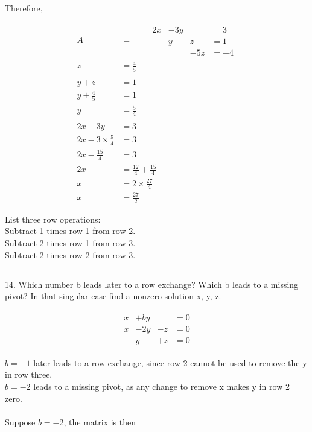 \documentclass[paper=a4, fontsize=10pt]{scrartcl} %
\begin{document}
	Therefore,

	\begin{align*}
		A &= \qquad
		\begin{matrix}
			2x & -3y &     &= 3 \\
			   &   y &   z &= 1 \\
			   &     & -5z &= -4
		\end{matrix}
		\\
		z &= \frac{4}{5} \\
		\\
		y + z &= 1 \\
		y + \frac{4}{5} &= 1 \\
		y &= \frac{5}{4} \\
		\\
		2x -3y &= 3 \\
		2x -3 \times \frac{5}{4} &= 3 \\
		2x -\frac{15}{4} &= 3 \\
		2x &= \frac{12}{4} + \frac{15}{4} \\
		x &= 2 \times \frac{27}{4} \\
		x &= \frac{27}{2}
	\end{align*}

List three row operations: \\
Subtract 1 times row 1 from row 2. \\
Subtract 2 times row 1 from row 3. \\
Subtract 2 times row 2 from row 3. \\

\subsection*{}
\setcounter{equation}{0}

14. Which number b leads later to a row exchange? Which b leads to a missing pivot? In that singular case find a nonzero solution x, y, z.


	\begin{align*}
		\begin{matrix}
			x &+ by &    &= 0 \\
			x &- 2y &- z &= 0 \\
			  &   y &+ z &= 0
		\end{matrix}
	\end{align*}


$b = -1$ later leads to a row exchange, since row 2 cannot be used to remove the y in row three. \\
$b = -2$ leads to a missing pivot, as any change to remove x makes y in row 2 zero. \\
\\
Suppose $b = -2$, the matrix is then \\
\end{document}
